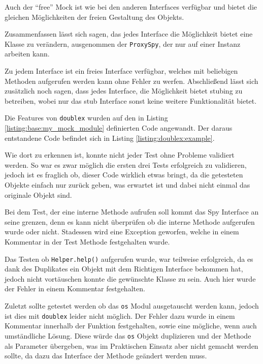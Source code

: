 Auch der "`free"' Mock ist wie bei den anderen Interfaces verfügbar und bietet
die gleichen Möglichkeiten der freien Gestaltung des Objekts.
\newline

Zusammenfassen lässt sich sagen, das jedes Interface die Möglichkeit bietet eine
Klasse zu verändern, ausgenommen der \lstinline{ProxySpy}, der nur auf einer
Instanz arbeiten kann.

Zu jedem Interface ist ein freies Interface verfügbar, welches mit beliebigen
Methoden aufgerufen werden kann ohne Fehler zu werfen. Abschließend lässt sich
zusätzlich noch sagen, dass jedes Interface, die Möglichkeit bietet
\gls{stub}ing zu betreiben, wobei nur das \Gls{stub} Interface sonst keine
weitere Funktionalität bietet.
\newline

Die Features von \lstinline{doublex} wurden auf den in Listing
\ref{listing:base:my_mock_module} definierten Code angewandt. Der daraus
entstandene Code befindet sich in Listing \ref{listing:doublex:example}.

Wie dort zu erkennen ist, konnte nicht jeder Test ohne Probleme validiert
werden. So war es zwar möglich die ersten drei Tests erfolgreich zu validieren,
jedoch ist es fraglich ob, dieser Code wirklich etwas bringt, da die getesteten
Objekte einfach nur zurück geben, was erwartet ist und dabei nicht einmal das
originale Objekt sind.

Bei dem Test, der eine interne Methode aufrufen soll kommt das Spy Interface an
seine grenzen, denn es kann nicht überprüfen ob die interne Methode aufgerufen
wurde oder nicht. Stadessen wird eine Exception geworfen, welche in einem
Kommentar in der Test Methode festgehalten wurde.

Das Testen ob \lstinline{Helper.help()} aufgerufen wurde, war teilweise
erfolgreich, da es dank des Duplikates ein Objekt mit dem Richtigen Interface
bekommen hat, jedoch nicht vortäuschen konnte die gewünschte Klasse zu sein.
Auch hier wurde der Fehler in einem Kommentar festgehalten.

Zuletzt sollte getestet werden ob das \lstinline{os} Modul ausgetauscht werden
kann, jedoch ist dies mit \lstinline{doublex} leider nicht möglich. Der Fehler
dazu wurde in einem Kommentar innerhalb der Funktion festgehalten, sowie eine
mögliche, wenn auch umständliche Lösung.
Diese würde das \lstinline{os} Objekt duplizieren und der Methode als
Parameter übergeben, was im Praktischen Einsatz aber nicht gemacht werden
sollte, da dazu das Interface der Methode geändert werden muss.
\newline

